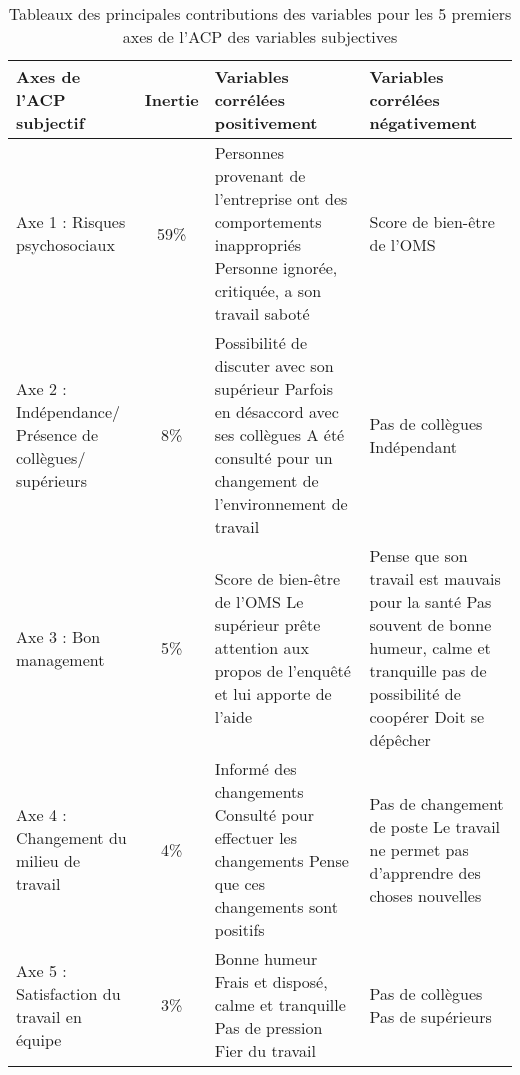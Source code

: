 \documentclass[11pt,fleqn,openany,frenchb]{book} %
\begin{document}
\begin{table}[!h]
\centering
\begin{tabular}{|p{3cm}|c|p{4.5cm}|p{4.5cm}|}
	\hline
    Axes de l'ACP \newline subjectif & Inertie & Variables corrélées positivement & Variables corrélées négativement\\ 
    \hline 
    Axe 1 : Risques psychosociaux & 59\% 
    & Personnes provenant de l'entreprise ont des comportements inappropriés 
    \newline Personne ignorée, critiquée, a son travail saboté
    & Score de bien-être de l'OMS\\
    \hline
    Axe 2 : Indépendance/ Présence de collègues/ supérieurs & 8\%
    & Possibilité de discuter avec son supérieur
    \newline Parfois en désaccord avec ses collègues
    \newline A été consulté pour un changement de l'environnement de travail
    & Pas de collègues
    \newline Indépendant \\
    \hline
    Axe 3 : Bon management & 5\%
    & Score de bien-être de l'OMS
    \newline Le supérieur prête attention aux propos de l'enquêté et lui apporte de l'aide
    \newline
    & Pense que son travail est mauvais pour la santé
    \newline Pas souvent de bonne humeur, calme et tranquille
    \newline pas de possibilité de coopérer
    \newline Doit se dépêcher\\
    \hline
    Axe 4 : Changement du milieu de travail & 4\% 
    & Informé des changements
    \newline Consulté pour effectuer les changements
    \newline Pense que ces changements sont positifs
    & Pas de changement de poste
    \newline Le travail ne permet pas d'apprendre des choses nouvelles\\
    \hline
    Axe 5 : Satisfaction du travail en équipe & 3\% 
    & Bonne humeur 
    \newline Frais et disposé, calme et tranquille
    \newline Pas de pression
    \newline Fier du travail
    & Pas de collègues
    \newline Pas de supérieurs\\
    \hline
    
\end{tabular}
\caption{Tableaux des principales contributions des variables pour les 5 premiers axes de l’ACP des variables subjectives}
\label{tab:ACPsubj}
\end{table}
\end{document}
